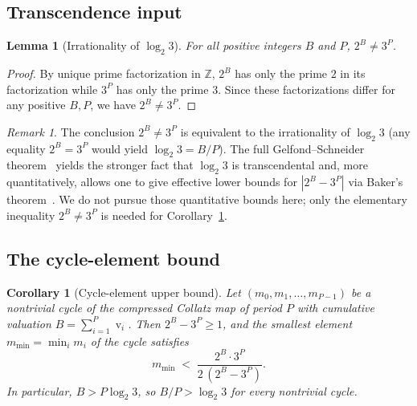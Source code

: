 \documentclass[11pt,a4paper]{article}
\newtheorem{lemma}[theorem]{Lemma}
\newtheorem{corollary}[theorem]{Corollary}
\theoremstyle{definition}
\theoremstyle{remark}
\newtheorem{remark}[theorem]{Remark}
\DeclareMathOperator{\val}{v}
\newcommand{\Z}{\mathbb{Z}}
\begin{document}
\subsection{Transcendence input}

\begin{lemma}[Irrationality of $\log_2 3$]\label{lem:gs}
For all positive integers $B$ and $P$, $2^B \neq 3^P$.
\end{lemma}

\begin{proof}
By unique prime factorization in $\Z$, $2^B$ has only the prime $2$
in its factorization while $3^P$ has only the prime $3$.  Since these
factorizations differ for any positive $B, P$, we have $2^B \neq 3^P$.
\end{proof}

\begin{remark}\label{rem:gs-elementary}
The conclusion $2^B \neq 3^P$ is equivalent to the irrationality of
$\log_2 3$ (any equality $2^B = 3^P$ would yield $\log_2 3 = B/P$).
The full Gelfond--Schneider theorem~\cite{Gelfond1934,Schneider1934}
yields the stronger fact that $\log_2 3$ is transcendental and, more
quantitatively, allows one to give effective lower bounds for
$|2^B - 3^P|$ via Baker's theorem~\cite{Baker1990}.  We do not pursue
those quantitative bounds here; only the elementary inequality
$2^B \neq 3^P$ is needed for Corollary~\ref{cor:cycle}.
\end{remark}

\subsection{The cycle-element bound}

\begin{corollary}[Cycle-element upper bound]\label{cor:cycle}
Let $(m_0, m_1, \ldots, m_{P-1})$ be a nontrivial cycle of the
compressed Collatz map of period $P$ with cumulative valuation
$B = \sum_{i=1}^{P} \val_i$.  Then $2^B - 3^P \geq 1$, and the
smallest element $m_{\min} = \min_i m_i$ of the cycle satisfies
\begin{equation}\label{eq:cyclebound}
  m_{\min} \;<\; \frac{2^B \cdot 3^P}{2 \, (2^B - 3^P)}.
\end{equation}
In particular, $B > P \log_2 3$, so $B/P > \log_2 3$ for every
nontrivial cycle.
\end{corollary}
\end{document}
